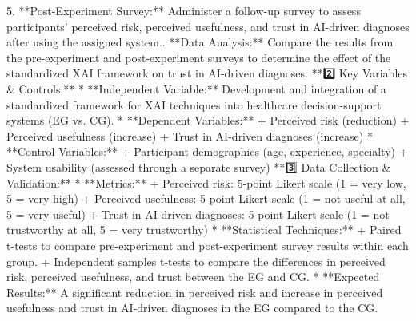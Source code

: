\documentclass{article}%
\begin{document}
5. **Post{-}Experiment Survey:** Administer a follow{-}up survey to assess participants' perceived risk, perceived usefulness, and trust in AI{-}driven diagnoses after using the assigned system.. **Data Analysis:** Compare the results from the pre{-}experiment and post{-}experiment surveys to determine the effect of the standardized XAI framework on trust in AI{-}driven diagnoses.\newline%
\newline%
**2️⃣ Key Variables \& Controls:**\newline%
\newline%
* **Independent Variable:** Development and integration of a standardized framework for XAI techniques into healthcare decision{-}support systems (EG vs. CG).\newline%
* **Dependent Variables:**\newline%
	+ Perceived risk (reduction)\newline%
	+ Perceived usefulness (increase)\newline%
	+ Trust in AI{-}driven diagnoses (increase)\newline%
* **Control Variables:**\newline%
	+ Participant demographics (age, experience, specialty)\newline%
	+ System usability (assessed through a separate survey)\newline%
\newline%
**3️⃣ Data Collection \& Validation:**\newline%
\newline%
* **Metrics:**\newline%
	+ Perceived risk: 5{-}point Likert scale (1 = very low, 5 = very high)\newline%
	+ Perceived usefulness: 5{-}point Likert scale (1 = not useful at all, 5 = very useful)\newline%
	+ Trust in AI{-}driven diagnoses: 5{-}point Likert scale (1 = not trustworthy at all, 5 = very trustworthy)\newline%
* **Statistical Techniques:**\newline%
	+ Paired t{-}tests to compare pre{-}experiment and post{-}experiment survey results within each group.\newline%
	+ Independent samples t{-}tests to compare the differences in perceived risk, perceived usefulness, and trust between the EG and CG.\newline%
* **Expected Results:** A significant reduction in perceived risk and increase in perceived usefulness and trust in AI{-}driven diagnoses in the EG compared to the CG.\newline%
\end{document}
